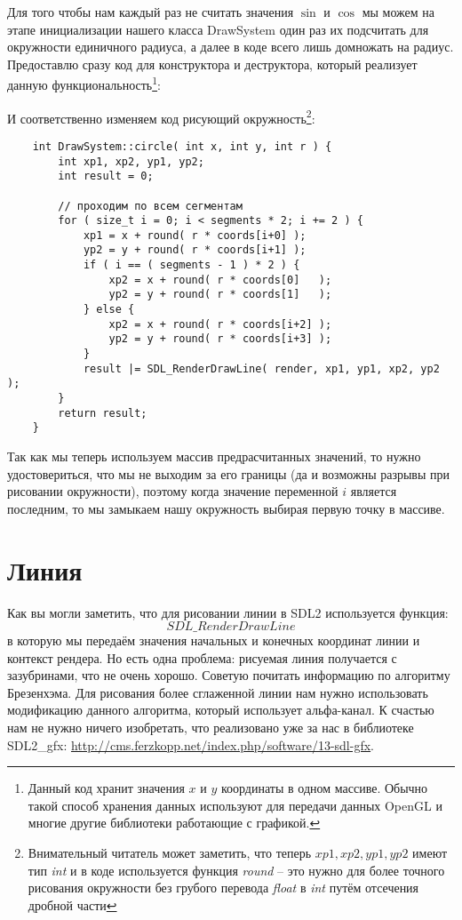 Для того чтобы нам каждый раз не считать значения \( \sin \) и \( \cos \) мы можем на этапе 
инициализации нашего класса DrawSystem один раз их подсчитать для окружности единичного радиуса, а 
далее в коде всего лишь домножать на радиус. Предоставлю сразу код для конструктора и деструктора, 
который реализует данную функциональность\footnote{Данный код хранит значения \( x \) и 
\( y \) координаты в одном массиве. Обычно такой способ хранения данных используют для передачи 
данных OpenGL и многие другие библиотеки работающие с графикой.}:


\pagebreak

И соответственно изменяем код рисующий окружность\footnote{Внимательный читатель может заметить, 
что теперь \( xp1, xp2, yp1, yp2 \) имеют тип \emph{int} и в коде используется функция 
\emph{round} -- это нужно для более точного рисования окружности без грубого перевода \emph{float} в 
\emph{int} путём отсечения дробной части}:
\begin{lstlisting}
    int DrawSystem::circle( int x, int y, int r ) {
        int xp1, xp2, yp1, yp2;
        int result = 0;

        // проходим по всем сегментам
        for ( size_t i = 0; i < segments * 2; i += 2 ) {
            xp1 = x + round( r * coords[i+0] );
            yp2 = y + round( r * coords[i+1] );
            if ( i == ( segments - 1 ) * 2 ) {
                xp2 = x + round( r * coords[0]   );
                yp2 = y + round( r * coords[1]   );
            } else {
                xp2 = x + round( r * coords[i+2] );
                yp2 = y + round( r * coords[i+3] );
            }
            result |= SDL_RenderDrawLine( render, xp1, yp1, xp2, yp2 );
        }
        return result;
    }
\end{lstlisting}

Так как мы теперь используем массив предрасчитанных значений, то нужно удостовериться, что мы 
не выходим за его границы (да и возможны разрывы при рисовании окружности), поэтому когда 
значение переменной \( i \) является последним, то мы замыкаем нашу окружность выбирая 
первую точку в массиве. 

\section{Линия}
Как вы могли заметить, что для рисовании линии в SDL2 используется функция:
\[ 
    SDL\_RenderDrawLine 
\]
в которую мы передаём значения начальных и конечных координат линии и контекст рендера. Но есть 
одна проблема: рисуемая линия получается с зазубринами, что не очень хорошо. Советую почитать 
информацию по алгоритму Брезенхэма. Для рисования более сглаженной линии нам нужно использовать 
модификацию данного алгоритма, который использует альфа-канал. К счастью нам не нужно ничего 
изобретать, что реализовано уже за нас в библиотеке SDL2\_gfx: 
\url{http://cms.ferzkopp.net/index.php/software/13-sdl-gfx}.


